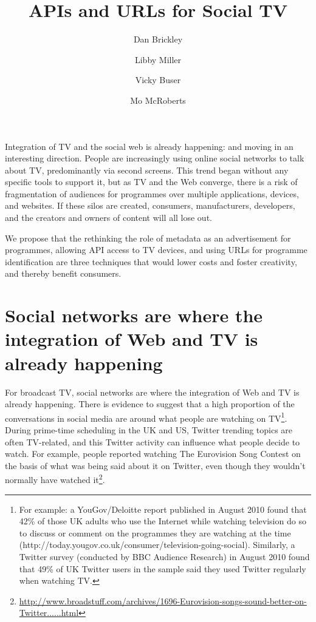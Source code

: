 \documentclass[]{article}%
\date{}
\title{APIs and URLs for Social TV}
\author{Dan Brickley}
\affil{Vrij Universiteit, Amsterdam; NoTube Project}
\author{Libby Miller}
\author{Vicky Buser}
\affil{BBC R\&D; NoTube Project}
\author{Mo McRoberts}
\affil{Project Baird}
\begin{document}
\ifpdf
{}
\else
{}
\fi

\maketitle
Integration of TV and the social web is already happening: and moving in an interesting direction. People are increasingly using online social networks to talk about TV, predominantly via second screens. This trend began without any specific tools to support it, but as TV and the Web converge, there is a risk of fragmentation of audiences for programmes over multiple applications, devices, and websites. If these silos are created, consumers, manufacturers, developers, and the creators and owners of content will all lose out.

We propose that the rethinking the role of metadata as an advertisement for programmes, allowing API access to TV devices, and using URLs for programme identification are three techniques that would lower costs and foster creativity, and thereby benefit consumers.

\section{Social networks are where the integration of Web and TV is already happening}

For broadcast TV, social networks are where the integration of Web and TV is already happening. There is evidence to suggest that a high proportion of the conversations in social media are around what people are watching on TV\footnote{For example: a YouGov/Deloitte report published in August 2010 found that 42\% of those UK adults who use the Internet while watching television do so to discuss or comment on the programmes they are watching at the time (http://today.yougov.co.uk/consumer/television-going-social). Similarly, a Twitter survey (conducted by BBC Audience Research) in August 2010 found that 49\% of UK Twitter users in the sample said they used Twitter regularly when watching TV.}. During prime-time scheduling in the UK and US, Twitter trending topics are often TV-related, and this Twitter activity can influence what people decide to watch. For example, people reported watching The Eurovision Song Contest on the basis of what was being said about it on Twitter, even though they wouldn't normally have watched it\footnote{\url{http://www.broadstuff.com/archives/1696-Eurovision-songs-sound-better-on-Twitter......html}}. 
\end{document}
